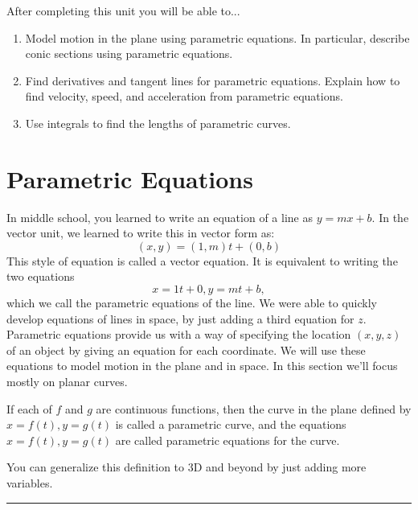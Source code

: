 \noindent After completing this unit you will be able to...
\begin{enumerate}
\item Model motion in the plane using parametric equations. In particular, describe conic sections using parametric equations. 
\item Find derivatives and tangent lines for parametric equations. Explain how to find velocity, speed, and acceleration from parametric equations.
\item Use integrals to find the lengths of parametric curves.
\end{enumerate}


\clearpage

\section{Parametric Equations}
In middle school, you learned to write an equation of a line as $y=mx+b$.  In the vector unit, we learned to write this in vector form as:
 $$(x,y)=(1,m)t+(0,b)$$
This style of equation is called a vector equation.  It is equivalent to writing the two equations $$x=1t+0,y=mt+b,$$ which we call the parametric equations of the line. We were able to quickly develop equations of lines in space, by just adding a third equation for $z$.\\

Parametric equations provide us with a way of specifying the location $(x,y,z)$ of an object by giving an equation for each coordinate.  We will use these equations to model motion in the plane and in space.  In this section we'll focus mostly on planar curves.

\begin{definition}
If each of $f$ and $g$ are continuous functions, then the curve in the plane defined by $x=f(t),y=g(t)$ is called a parametric curve, and the equations $x=f(t),y=g(t)$ are called parametric equations for the curve. 
\end{definition}

You can generalize this definition to 3D and beyond by just adding more variables.

\vspace{0.1in}

\hrule

